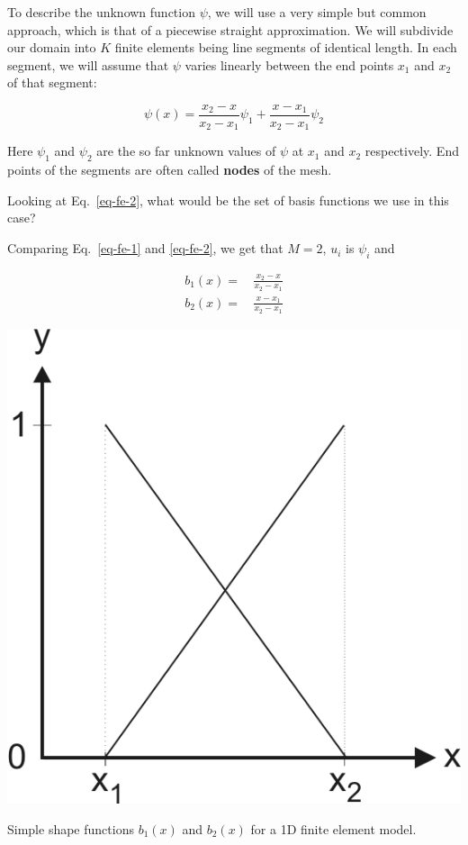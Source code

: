 To describe the unknown function $\psi$, we will use a very simple but common approach, which is that of a piecewise straight approximation. We will subdivide our domain into $K$ finite elements being line segments of identical length. In each segment, we will assume that $\psi$ varies linearly between the end points $x_1$ and $x_2$ of that segment:

\begin{equation}
\psi(x) = \frac{x_2 - x}{x_2 - x_1} \psi_1 + \frac{x - x_1}{x_2 - x_1} \psi_2 \label{eq-fe-2}
\end{equation} 

Here $\psi_1$ and $\psi_2$ are the so far unknown values of $\psi$ at $x_1$ and $x_2$ respectively. End points of the segments are often called \textbf{nodes} of the mesh.

\begin{cue}
Looking at Eq.~\ref{eq-fe-2}, what would be the set of basis functions we use in this case?
\end{cue}

Comparing Eq.~\ref{eq-fe-1} and \ref{eq-fe-2}, we get that $M=2$, $u_i$ is $\psi_i$ and

\begin{align}
b_1(x) =& \, \frac{x_2 - x}{x_2 - x_1} \\
b_2(x) =& \, \frac{x - x_1}{x_2 - x_1}
\end{align} 

\begin{marginfigure}
\centering
\includegraphics{numeric/figures/interpol}
\caption{Simple shape functions $b_1(x)$ and $b_2(x)$ for a 1D finite element model.}
\label{fig-shape}
\end{marginfigure}

